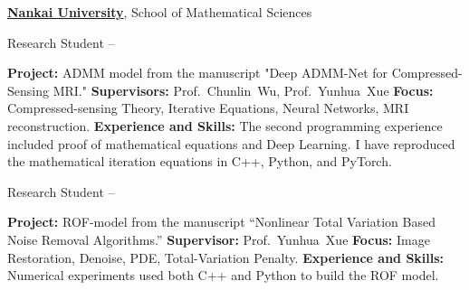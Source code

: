\documentclass[a4paper,MMMyyyy,nonstopmode]{simpleresumecv}
\begin{document}
\begin{Body}
\BigGap
\Entry
\href{https://www.nankai.edu.cn/main.htm}
{\textbf{Nankai University}},
School of Mathematical Sciences

\Gap
\BulletItem
Research Student
\hfill
{} --
\begin{Detail}
\SubBulletItem
\textbf{Project:}
ADMM model from the manuscript "Deep ADMM-Net for Compressed-Sensing MRI."
\SubBulletItem
\textbf{Supervisors:}
Prof.~Chunlin~Wu, 
Prof.~Yunhua~Xue
\SubBulletItem
\textbf{Focus:}
Compressed-sensing Theory, Iterative Equations, Neural Networks, MRI reconstruction.
\SubBulletItem
\textbf{Experience and Skills:}
The second programming experience included proof of mathematical equations and Deep Learning. 
I have reproduced the mathematical iteration equations in C++, Python, and PyTorch.
\end{Detail}

\BigGap
\BulletItem
Research Student
\hfill
{} --
\begin{Detail}
\SubBulletItem
\textbf{Project:}
ROF-model from the manuscript “Nonlinear Total Variation Based Noise Removal Algorithms.”
\SubBulletItem
\textbf{Supervisor:}
Prof.~Yunhua~Xue
\SubBulletItem
\textbf{Focus:}
Image Restoration, Denoise, PDE, Total-Variation Penalty.
\SubBulletItem
\textbf{Experience and Skills:}
Numerical experiments used both C++ and Python to build the ROF model.
\end{Detail}







\end{Body}
\end{document}
